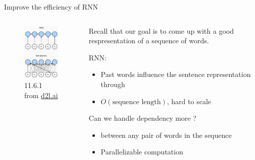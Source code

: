 \documentclass[usenames,dvipsnames,notes,11pt,aspectratio=169,hyperref={colorlinks=true, linkcolor=blue}]{beamer}
\begin{document}
\begin{frame}
    {Improve the efficiency of RNN}
    \begin{columns}
        \begin{column}{0.4\textwidth}
            \begin{figure}
                \includegraphics[width=4cm]{figures/rnn-attention-compare}
                \caption{11.6.1 from \href{https://d2l.ai/chapter_attention-mechanisms-and-transformers/self-attention-and-positional-encoding.html}{d2l.ai}}
            \end{figure}
        \end{column}
        \begin{column}{0.6\textwidth}
            Recall that our goal is to come up with a good respresentation of a sequence of words.\\
            \medskip

            RNN:\\
            \begin{itemize}
                \item Past words influence the sentence representation through 
                \item {} $O(\text{sequence length})$, hard to scale
            \end{itemize}
            \medskip
            \pause

            Can we handle dependency more ?\\
            \begin{itemize}
                \item {} between any pair of words in the sequence
                \item Parallelizable computation 
            \end{itemize}
        \end{column}
    \end{columns}
\end{frame}
\end{document}
